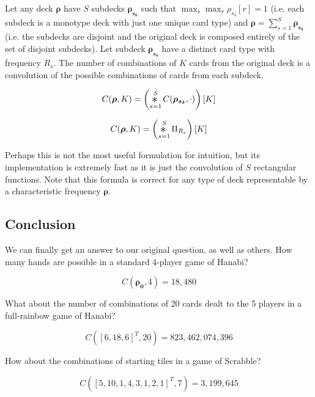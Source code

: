 \documentclass{article}
\newcommand{\Conv}{\mathop{\scalebox{1.5}{\raisebox{-0.2ex}{$\ast$}}}}%
\begin{document}
Let any deck $\bm{\rho}$ have $S$ subdecks $\bm{\rho_{s_\delta}}$ such that $\max_{s}\max_{r}\rho_{s_\delta}[r] = 1$ (i.e. each subdeck is a monotype deck with just one unique card type) and $\bm{\rho} = \sum_{s = 1}^S \bm{\rho_{s_{\delta}}}$ (i.e. the subdecks are disjoint and the original deck is composed entirely of the set of disjoint subdecks). Let subdeck $\bm{\rho_{s_{\delta}}}$ have a distinct card type with frequency $R_s$. The number of combinations of $K$ cards from the original deck is a convolution of the possible combinations of cards from each subdeck.

\begin{equation}
    C(\bm{\rho}, K) =  \left (\Conv_{s = 1}^S C(\bm{\rho_{s_{\delta}}}, \cdot)\right )[K]
\end{equation}

\begin{equation}
    C(\bm{\rho}, K) =  \left (\Conv_{s = 1}^S \Pi_{R_{s}}\right )[K]
\end{equation}

Perhaps this is not the most useful formulation for intuition, but its implementation is extremely fast as it is just the convolution of $S$ rectangular functions. Note that this formula is correct for any type of deck representable by a characteristic frequency $\bm{\rho}$.

\subsection{Conclusion}

We can finally get an answer to our original question, as well as others. How many hands are possible in a standard 4-player game of Hanabi?

\begin{equation}
    C(\bm{\rho_0}, 4) = 18,480
\end{equation}

What about the number of combinations of 20 cards dealt to the 5 players in a full-rainbow game of Hanabi?

\begin{equation}
    C([6, 18, 6]^T, 20) = 823,462,074,396
\end{equation}

How about the combinations of starting tiles in a game of Scrabble?

\begin{equation}
    C([5, 10, 1, 4, 3, 1, 2, 1]^T, 7) = 3,199,645
\end{equation}
\end{document}
